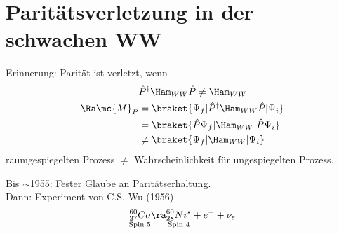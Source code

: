 \section{Paritätsverletzung in der schwachen WW}
Erinnerung: Parität ist verletzt, wenn
\begin{align}\begin{split}
&\hat{P}^\dagger \Ham_{WW} \hat{P} \neq \Ham_{WW}\\
\Ra \mc{M}_P &= \braket{\Psi_f | \hat{P}^\dagger \Ham_{WW} \hat{P} | \Psi_i}\\
& = \braket{\hat{P}\Psi_f | \Ham_{WW} | \hat{P} \Psi_i}\\
& \neq \braket{\Psi_f | \Ham_{WW} | \Psi_i}
\end{split}\end{align}
raumgespiegelten Prozess $\neq$ Wahrscheinlichkeit für ungespiegelten Prozess.

Bis $\sim$1955: Fester \glqq Glaube\grqq{} an Paritätserhaltung.\\Dann: Experiment von C.S. Wu (1956)
\begin{align*}
\underset{\text{Spin 5}}{^{60}_{27} Co} \ra \underset{\text{Spin 4}}{^{60}_{28} Ni^\star} + e^- + \bar{\nu}_e
\end{align*}

